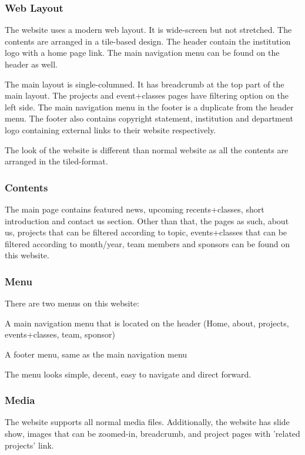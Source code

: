 \subsubsection*{Web Layout}
The website uses a modern web layout. It is wide-screen but not stretched. The contents are arranged in a tile-based design. The header contain the institution logo with a home page link. The main navigation menu can be found on the header as well.

The main layout is single-columned. It has breadcrumb at the top part of the main layout. The projects and event+classes pages have filtering option on the left side. The main navigation menu in the footer is a duplicate from the header menu. The footer also contains copyright statement, institution and department logo containing external links to their website respectively.

The look of the website is different than normal website as all the contents are arranged in the tiled-format.

\subsubsection*{Contents}
The main page contains featured news, upcoming recents+classes, short introduction and contact us section. Other than that, the pages as such, about us, projects that can be filtered according to topic, events+classes that can be filtered according to month/year, team members and sponsors can be found on this website.

\subsubsection*{Menu}
There are two menus on this website:
\begin{itemize*}
\item A main navigation menu that is located on the header (Home, about, projects, events+classes, team, sponsor)
\item A footer menu, same as the main navigation menu
\end{itemize*}

The menu looks simple, decent, easy to navigate and direct forward.

\subsubsection*{Media}
The website supports all normal media files. Additionally, the website has slide show, images that can be zoomed-in, breadcrumb, and project pages with 'related projects' link.

